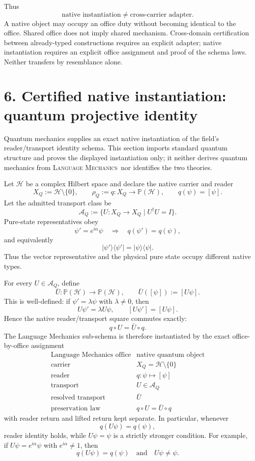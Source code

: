 \documentclass[10.5pt]{article}
\newcommand{\LM}{\textsc{Language Mechanics}}
\begin{document}
Thus
\[
\boxed{\text{native instantiation}\neq\text{cross-carrier adapter}.}
\]
A native object may occupy an office duty without becoming identical to the office. Shared office does not imply shared mechanism. Cross-domain certification between already-typed constructions requires an explicit adapter; native instantiation requires an explicit office assignment and proof of the schema laws. Neither transfers by resemblance alone.

\section*{6. Certified native instantiation: quantum projective identity}
Quantum mechanics supplies an exact native instantiation of the field's reader/transport identity schema. This section imports standard quantum structure and proves the displayed instantiation only; it neither derives quantum mechanics from \LM\ nor identifies the two theories.

Let $\mathcal H$ be a complex Hilbert space and declare the native carrier and reader
\[
X_Q:=\mathcal H\setminus\{0\},
\qquad
\rho_Q:=q:X_Q\longrightarrow\mathbb P(\mathcal H),
\qquad
q(\psi)=[\psi].
\]
Let the admitted transport class be
\[
\mathcal A_Q:=\{U:X_Q\to X_Q\mid U^\dagger U=I\}.
\]
Pure-state representatives obey
\[
\psi'=e^{i\alpha}\psi
\quad\Longrightarrow\quad
q(\psi')=q(\psi),
\]
and equivalently
\[
|\psi'\rangle\langle\psi'|
=
|\psi\rangle\langle\psi|.
\]
Thus the vector representative and the physical pure state occupy different native types.

For every $U\in\mathcal A_Q$, define
\[
\bar U:\mathbb P(\mathcal H)\longrightarrow\mathbb P(\mathcal H),
\qquad
\bar U([\psi]):=[U\psi].
\]
This is well-defined: if $\psi'=\lambda\psi$ with $\lambda\neq0$, then
\[
U\psi'=\lambda U\psi,
\qquad
[U\psi']=[U\psi].
\]
Hence the native reader/transport square commutes exactly:
\[
\boxed{q\circ U=\bar U\circ q.}
\]
The Language Mechanics sub-schema is therefore instantiated by the exact office-by-office assignment
\[
\begin{array}{c|c}
\text{Language Mechanics office} & \text{native quantum object}\\ \hline
\text{carrier} & X_Q=\mathcal H\setminus\{0\}\\
\text{reader} & q:\psi\mapsto[\psi]\\
\text{transport} & U\in\mathcal A_Q\\
\text{resolved transport} & \bar U\\
\text{preservation law} & q\circ U=\bar U\circ q
\end{array}
\]
with reader return and lifted return kept separate. In particular, whenever
\[
q(U\psi)=q(\psi),
\]
reader identity holds, while $U\psi=\psi$ is a strictly stronger condition. For example, if $U\psi=e^{i\alpha}\psi$ with $e^{i\alpha}\neq1$, then
\[
\boxed{q(U\psi)=q(\psi)\quad\text{and}\quad U\psi\neq\psi.}
\]
\end{document}
